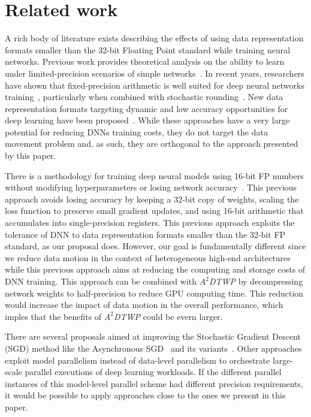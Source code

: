 \section{Related work}
\label{sec:Relatedworks}
A rich body of literature exists describing the effects of using  
data representation formats smaller than the 32-bit Floating Point standard while training neural networks. 
Previous work provides theoretical analysis on the  
ability to learn under limited-precision scenarios of simple networks~\cite{holi93}. 
In recent years, researchers have shown that fixed-precision arithmetic is well suited 
for deep neural networks training~\cite{courbariaux14}, particularly when combined with
stochastic rounding~\cite{gupta15}. 
New data representation formats targeting dynamic and low accuracy opportunities for deep learning have been proposed~\cite{flexpoint17}.
While these approaches have a very large potential for reducing DNNs training costs, 
they do not target 
the data movement problem and, as such, they are orthogonal to the approach 
presented by this paper.

There is a methodology for training deep neural models using 16-bit FP numbers without modifying hyperparameters or losing network accuracy~\cite{Micikevicius2018}.
This previous approach avoids losing accuracy by keeping a 32-bit copy of weights,
scaling the loss function to preserve small gradient updates, and
using 16-bit arithmetic that accumulates into single-precision registers.
This previous approach exploits the tolerance of DNN to data representation formats smaller than the 32-bit FP standard, as our proposal does.
However, our goal is fundamentally different since we reduce data motion in the context of heterogeneous high-end architectures while this previous approach aims at reducing the computing and storage costs of DNN training.
This approach can be combined with \textit{$A^2$DTWP} by decompressing network weights to half-precision to reduce GPU computing time.
This reduction would increase the impact of data motion in the overall performance, which imples that the benefits of \textit{$A^2$DTWP} could be evern larger. 

There are several proposals aimed at improving the Stochastic Gradient Descent (SGD) method like the
Asynchronous SGD~\cite{jeff12} and its variants~\cite{hogwild, 
zhang14}. 
Other approaches \cite{coates13, quoc11} exploit 
model parallelism instead of data-level parallelism to orchestrate large-scale parallel executions of deep learning workloads. 
If the different parallel instances of this model-level parallel scheme had 
different precision requirements, it would be possible to apply approaches close to the ones we present in this paper.


